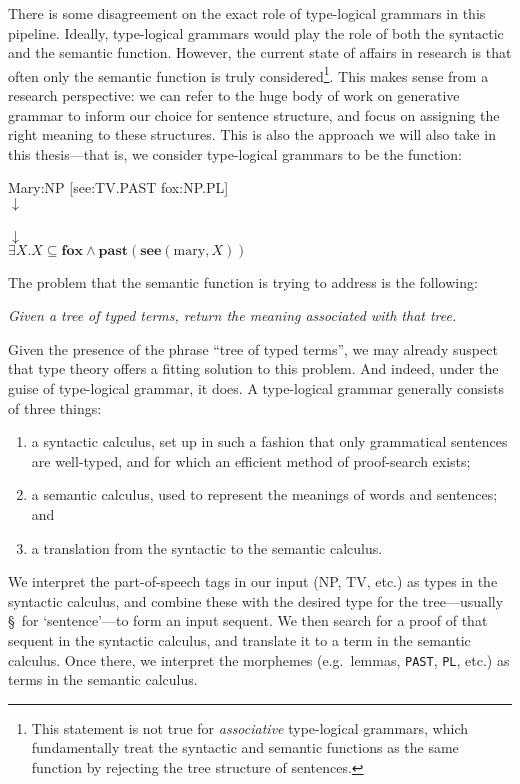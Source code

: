 There is some disagreement on the exact role of type-logical grammars in
this pipeline. Ideally, type-logical grammars would play the role of
both the syntactic and the semantic function. However, the current
state of affairs in research is that often only the semantic function
is truly considered\footnote{%
  This statement is not true for \emph{associative} type-logical
  grammars, which fundamentally treat the syntactic and semantic
  functions as the same function by rejecting the tree structure of
  sentences.
}. This makes sense from a research perspective: we can refer to the
huge body of work on generative grammar to inform our choice for
sentence structure, and focus on assigning the right meaning to these
structures. This is also the approach we will also take in this
thesis---that is, we consider type-logical grammars to be the
function:
\begin{center}
  Mary:NP [see:TV.PAST fox:NP.PL]\\
  $\downarrow$\\
  \\
  $\downarrow$\\
  $\exists X.X\subseteq\mathbf{fox}\land\mathbf{past}(\mathbf{see}(\text{mary},X))$
\end{center}
The problem that the semantic function is trying to address is the
following:
\begin{center}\itshape
  Given a tree of typed terms, return the meaning associated with that tree.
\end{center}
Given the presence of the phrase ``tree of typed terms'', we may
already suspect that type theory offers a fitting solution to this
problem. And indeed, under the guise of type-logical grammar, it
does. A type-logical grammar generally consists of three things:
\begin{enumerate}[label=(\arabic*)]
\item a syntactic calculus, set up in such a fashion that only
  grammatical sentences are well-typed, and for which an efficient
  method of proof-search exists;
\item a semantic calculus, used to represent the meanings of words and
  sentences; and
\item a translation from the syntactic to the semantic calculus.
\end{enumerate}
We interpret the part-of-speech tags in our input (NP, TV, etc.) as
types in the syntactic calculus, and combine these with the desired
type for the tree---usually \S\ for `sentence'---to form an input
sequent.
We then search for a proof of that sequent in the syntactic calculus,
and translate it to a term in the semantic calculus.
Once there, we interpret the morphemes (e.g.\ lemmas, \texttt{PAST},
\texttt{PL}, etc.) as terms in the semantic calculus.


